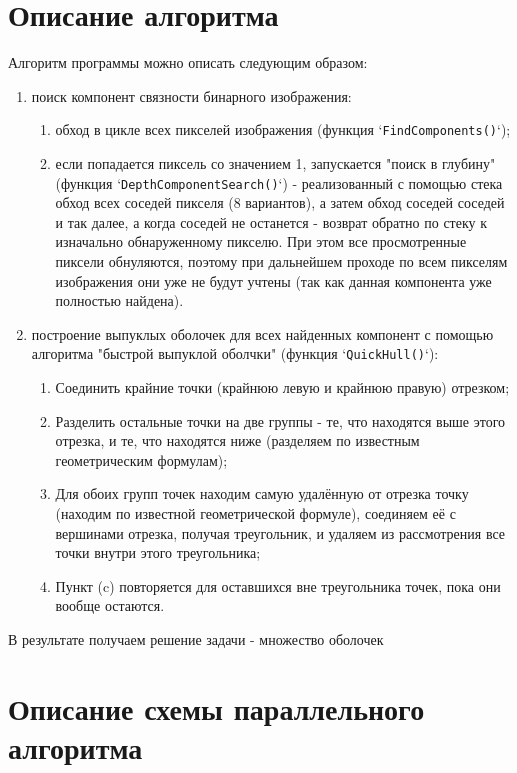 \documentclass[12pt]{article}
\begin{document}
\section{Описание алгоритма}
Алгоритм программы можно описать следующим образом:
\begin{enumerate}
    \item поиск компонент связности бинарного изображения:
        \begin{enumerate}
            \item обход в цикле всех пикселей изображения (функция `\texttt{FindComponents()}`);
            \item если попадается пиксель со значением 1, запускается "поиск в глубину" (функция `\texttt{DepthComponentSearch()}`) - реализованный с помощью стека обход всех соседей пикселя (8 вариантов), а затем обход соседей соседей и так далее, а когда соседей не останется - возврат обратно по стеку к изначально обнаруженному пикселю. При этом все просмотренные пиксели обнуляются, поэтому при дальнейшем проходе по всем пикселям изображения они уже не будут учтены (так как данная компонента уже полностью найдена).
        \end{enumerate}
    \item построение выпуклых оболочек для всех найденных компонент с помощью алгоритма "быстрой выпуклой оболчки" (функция `\texttt{QuickHull()}`):
        \begin{enumerate}
            \item Соединить крайние точки (крайнюю левую и крайнюю правую) отрезком;
            \item Разделить остальные точки на две группы - те, что находятся выше этого отрезка, и те, что находятся ниже (разделяем по известным геометрическим формулам);
            \item Для обоих групп точек находим самую удалённую от отрезка точку (находим по известной геометрической формуле), соединяем её с вершинами отрезка, получая треугольник, и удаляем из рассмотрения все точки внутри этого треугольника;
            \item Пункт (c) повторяется для оставшихся вне треугольника точек, пока они вообще остаются.
        \end{enumerate}
\end{enumerate}

В результате получаем решение задачи - множество оболочек

\newpage

\section{Описание схемы параллельного алгоритма}
\end{document}
